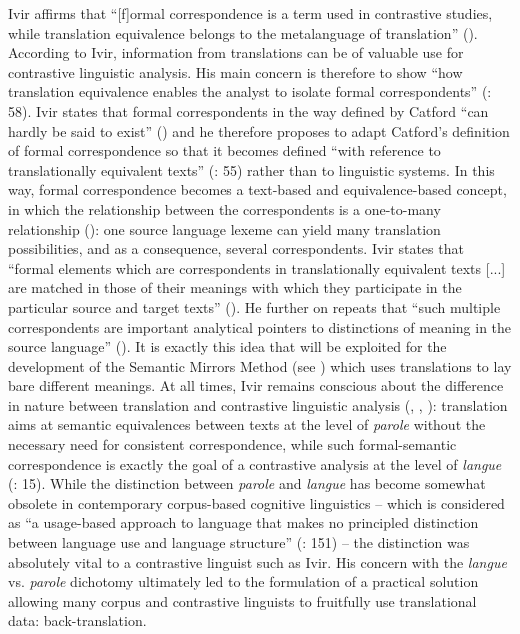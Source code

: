 Ivir affirms that “[f]ormal correspondence is a term used in contrastive studies, while translation equivalence belongs to the metalanguage of translation” (\citeyear[51]{ivir_formal_1981}). According to Ivir, information from translations can be of valuable use for contrastive linguistic analysis. His main concern is therefore to show “how translation equivalence enables the analyst to isolate formal correspondents” (\citealt{ivir_formal_1981}: 58). Ivir states that formal correspondents in the way defined by Catford “can hardly be said to exist” (\citeyear[54]{ivir_formal_1981}) and he therefore proposes to adapt Catford’s definition of formal correspondence so that it becomes defined “with reference to translationally equivalent texts” (\citealt{ivir_formal_1981}: 55) rather than to linguistic systems. In this way, formal correspondence becomes a text-based and equivalence-based concept, in which the relationship between the correspondents is a one-to-many relationship (\citeyear[55]{ivir_formal_1981}): one source language lexeme can yield many translation possibilities, and as a consequence, several correspondents. Ivir states that “formal elements which are correspondents in translationally equivalent texts [...] are matched in those of their meanings with which they participate in the particular source and target texts” (\citeyear[55]{ivir_formal_1981}). He further on repeats that “such multiple correspondents are important analytical pointers to distinctions of meaning in the source language” (\citeyear[56]{ivir_formal_1981}). It is exactly this idea that will be exploited for the development of the Semantic Mirrors Method (see ) which uses translations to lay bare different meanings. At all times, Ivir remains conscious about the difference in nature between translation and contrastive linguistic analysis (\citealt[15]{ivir_contrasting_1969}, \citealt[17]{ivir_remarks_1970}, \citealt[173]{ivir_translation-based_1983}): translation aims at semantic equivalences between texts at the level of \textit{parole} without the necessary need for consistent correspondence, while such formal-semantic correspondence is exactly the goal of a contrastive analysis at the level of \textit{langue} (\citealt{ivir_contrasting_1969}: 15). While the distinction between \textit{parole} and \textit{langue} has become somewhat obsolete in contemporary corpus-based cognitive linguistics – which is considered as “a usage-based approach to language that makes no principled distinction between language use and language structure” (\citealt{glynn_visualizing_2014}: 151) – the distinction was absolutely vital to a contrastive linguist such as Ivir. His concern with the \textit{langue} vs. \textit{parole} dichotomy ultimately led to the formulation of a practical solution allowing many corpus and contrastive linguists to fruitfully use translational data: back-translation.



